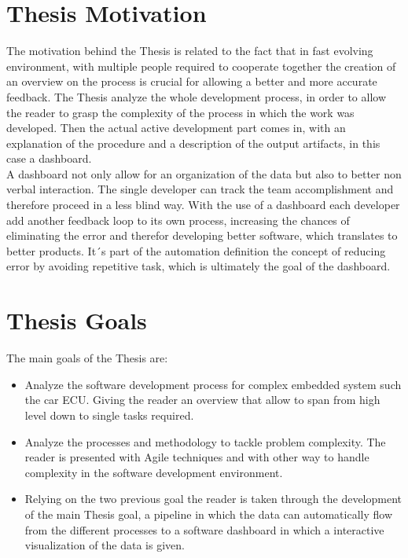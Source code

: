 \documentclass[../main.tex]{subfiles}
\begin{document}
\section{Thesis Motivation}
The motivation behind the Thesis is related to the fact that in fast evolving environment, with multiple people required to cooperate together the creation of an overview on the process is crucial for allowing a better and more accurate feedback. 
The Thesis analyze the whole development process, in order to allow the reader to grasp the complexity of the process in which the work was developed. Then the actual active development part comes in, with an explanation of the procedure and a description of the output artifacts, in this case a dashboard.\\
A dashboard not only allow for an organization of the data but also to better non verbal interaction. The single developer can track the team accomplishment and therefore proceed in a less blind way. With the use of a dashboard each developer add another feedback loop to its own process, increasing the chances of eliminating the error and therefor developing better software, which translates to better products. It´s part of the automation definition the concept of reducing error by avoiding repetitive task, which is ultimately the goal of the dashboard. 
\section{Thesis Goals}
The main goals of the Thesis are:
\begin{itemize}
    \item Analyze the software development process for complex embedded system such the car ECU. Giving the reader an overview that allow to span from high level down to single tasks required. 
    \item Analyze the processes and methodology to tackle problem complexity. The reader is presented with Agile techniques and with other way to handle complexity in the software development environment.
    \item Relying on the two previous goal the reader is taken through the development of the main Thesis goal, a pipeline in which the data can automatically flow from the different processes to a software dashboard in which a interactive visualization of the data is given. 
\end{itemize}
\cleardoublepage
\end{document}
